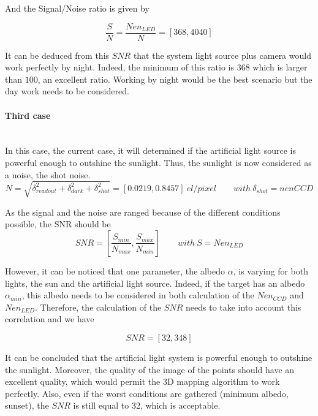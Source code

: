 And the Signal/Noise ratio is given by

\begin{equation}
\label{eq:Signal Noise Ratio case2}
\frac{S}{N} = \frac{Nen_{LED}}{N} = [368, 4040]
\end{equation}

It can be deduced from this $SNR$ that the system light source plus camera would work perfectly by night. Indeed, the minimum of this ratio is $368$ which is larger than $100$, an excellent ratio. Working by night would be the best scenario but the day work needs to be considered.


\paragraph*{Third case} \label{thirdcase}
~~\\
In this case, the current case, it will determined if the artificial light source is powerful enough to outshine the sunlight. Thus, the sunlight is now considered as a noise, the shot noise. 
\begin{equation}
\label{eq:Noise case3}
N = \sqrt{\delta_{readout}^2+\delta_{dark}^2+\delta_{shot}^2} = [0.0219, 0.8457]\ el/pixel \qquad with\ \delta_{shot} = nenCCD
\end{equation}


As the signal and the noise are ranged because of the different conditions possible, the SNR should be 
\begin{equation*}
SNR = \left[\frac{S_{min}}{N_{max}}, \frac{S_{max}}{N_{min}}\right] \qquad with\ S=Nen_{LED}
\end{equation*}

However, it can be noticed that one parameter, the albedo $\alpha$, is varying for both lights, the sun and the artificial light source. Indeed, if the target has an albedo $\alpha_{min}$, this albedo needs to be considered in both calculation of the $Nen_{CCD}$ and $Nen_{LED}$. Therefore, the calculation of the $SNR$ needs to take into account this correlation and we have

\begin{equation}
SNR = [32, 348]
\end{equation}

It can be concluded that the artificial light system is powerful enough to outshine the sunlight. Moreover, the quality of the image of the points should have an excellent quality, which would permit the 3D mapping algorithm to work perfectly. Also, even if the worst conditions are gathered (minimum albedo, sunset), the $SNR$ is still equal to 32, which is acceptable.



